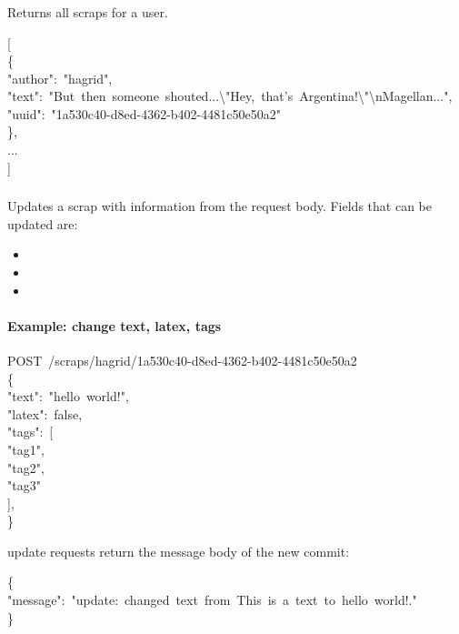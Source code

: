 \documentclass[onecolumn, draftclsnofoot, 10pt, compsoc]{IEEEtran}
\begin{document}
\subsubsection{}\label{sec-get-scrapsauthor}%

\noindent Returns all scraps for a user.%
\begin{mdpre}%
\noindent{}[\\
\{\\
"author":~"hagrid",\\
"text":~"But~then~someone~shouted...\textbackslash{}"Hey,~that's~Argentina!\textbackslash{}"\textbackslash{}nMagellan...",\\
"uuid":~"1a530c40-d8ed-4362-b402-4481c50e50a2"\\
\},\\
...\\
]%
\end{mdpre}
\subsubsection{}\label{sec-post-scrapsauthoruuid}%

\noindent Updates a scrap with information from the request body. Fields that can be updated
are:%

\begin{itemize}[noitemsep,topsep=\mdcompacttopsep]%

\item{}%

\item{}%

\item{}%
\end{itemize}%

\paragraph{Example: change text, latex, tags}\label{sec-example--change-text-latex-tags}%
\begin{mdpre}%
\noindent POST~/scraps/hagrid/1a530c40-d8ed-4362-b402-4481c50e50a2\\
\{\\
"text":~"hello~world!",\\
"latex":~false,\\
"tags":~{}[\\
"tag1",\\
"tag2",\\
"tag3"\\
],\\
\}%
\end{mdpre}\noindent{} update requests return the message body of the new commit:
\begin{mdpre}%
\noindent\{\\
"message":~"update:~changed~text~from~This~is~a~text~to~hello~world!."\\
\}%
\end{mdpre}
\end{document}
